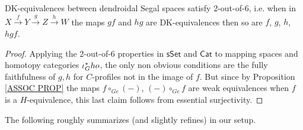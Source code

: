\documentclass[a4paper,10pt
,draft
]{article}%
\begin{document}


\begin{corollary}\label{26COR}
DK-equivalences between dendroidal Segal spaces satisfy 2-out-of-6, i.e. when in
$X \xrightarrow{f} 
Y \xrightarrow{g}
Z \xrightarrow{h} W$ the maps
$gf$ and $hg$ are DK-equivalences then so are
$f$, $g$, $h$, $hgf$.
\end{corollary}

\begin{proof}
Applying the 2-out-of-6 properties in $\mathsf{sSet}$ and $\mathsf{Cat}$ to mapping spaces and homotopy categories $\iota_G^{\**}ho$,
the only non obvious conditions are the fully faithfulness of $g,h$ for $C$-profiles not in the image of $f$. 
But since by Proposition \ref{ASSOC PROP} the maps
$f \circ_{Ge} (-)$, $(-)\circ_{Ge} f$
are weak equivalences when $f$ is a $H$-equivalence,
this last claim follows from essential surjectivity.
\end{proof}


The following roughly summarizes (and slightly refines)
\cite[Lemma 5.8, Theorem 6.2, Prop. 11.1, Lemma 11.10]{Rez01} in our setup.
\end{document}
